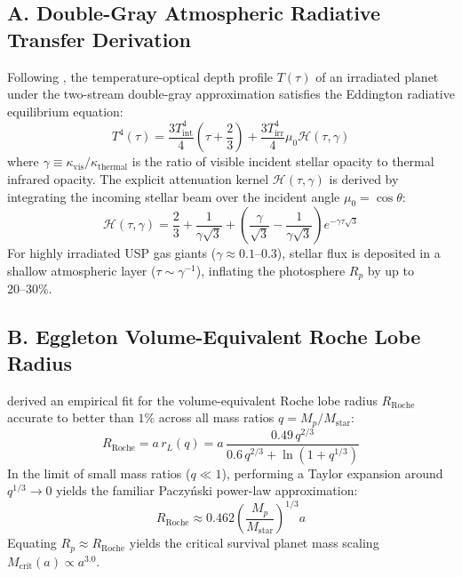 \documentclass[twocolumn,10pt]{article}
\providecommand{\citet}[1]{\cite{#1}}
\begin{document}
\subsection{A. Double-Gray Atmospheric Radiative Transfer Derivation} \label{app:double_gray}
Following \citet{Guillot2010}, the temperature-optical depth profile $T(\tau)$ of an irradiated planet under the two-stream double-gray approximation satisfies the Eddington radiative equilibrium equation:
\begin{equation}
T^4(\tau) = \frac{3 T_{\text{int}}^4}{4} \left( \tau + \frac{2}{3} \right) + \frac{3 T_{\text{irr}}^4}{4} \mu_0 \mathcal{H}(\tau, \gamma)
\end{equation}
where $\gamma \equiv \kappa_{\text{vis}} / \kappa_{\text{thermal}}$ is the ratio of visible incident stellar opacity to thermal infrared opacity. The explicit attenuation kernel $\mathcal{H}(\tau, \gamma)$ is derived by integrating the incoming stellar beam over the incident angle $\mu_0 = \cos \theta$:
\begin{equation}
\mathcal{H}(\tau, \gamma) = \frac{2}{3} + \frac{1}{\gamma\sqrt{3}} + \left( \frac{\gamma}{\sqrt{3}} - \frac{1}{\gamma\sqrt{3}} \right) e^{-\gamma \tau \sqrt{3}}
\end{equation}
For highly irradiated USP gas giants ($\gamma \approx 0.1\text{--}0.3$), stellar flux is deposited in a shallow atmospheric layer ($\tau \sim \gamma^{-1}$), inflating the photosphere $R_p$ by up to $20\text{--}30\%$.

\subsection{B. Eggleton Volume-Equivalent Roche Lobe Radius} \label{app:roche}
\citet{Eggleton1983} derived an empirical fit for the volume-equivalent Roche lobe radius $R_{\text{Roche}}$ accurate to better than $1\%$ across all mass ratios $q = M_p / M_{\text{star}}$:
\begin{equation}
R_{\text{Roche}} = a \, r_L(q) = a \, \frac{0.49 \, q^{2/3}}{0.6 \, q^{2/3} + \ln(1 + q^{1/3})}
\end{equation}
In the limit of small mass ratios ($q \ll 1$), performing a Taylor expansion around $q^{1/3} \to 0$ yields the familiar Paczyński power-law approximation:
\begin{equation}
R_{\text{Roche}} \approx 0.462 \left( \frac{M_p}{M_{\text{star}}} \right)^{1/3} a
\end{equation}
Equating $R_p \approx R_{\text{Roche}}$ yields the critical survival planet mass scaling $M_{\text{crit}}(a) \propto a^{3.0}$.
\end{document}
